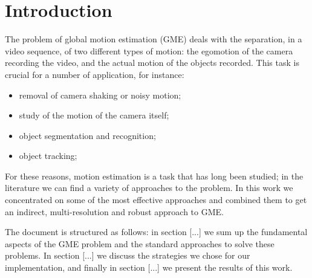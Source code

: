 \section{Introduction}
The problem of global motion estimation (GME) deals with the separation, in a video sequence, of two different types of motion: the egomotion of the camera recording the video, and the actual motion of the objects recorded. This task is crucial for a number of application, for instance:
\begin{itemize}
    \item removal of camera shaking or noisy motion;
    \item study of the motion of the camera itself;
    \item object segmentation and recognition;
    \item object tracking;
\end{itemize}

For these reasons, motion estimation is a task that has long been studied; in the literature we can find a variety of approaches to the problem. In this work we concentrated on some of the most effective approaches and combined them to get an indirect, multi-resolution and robust approach to GME.

The document is structured as follows: in section [...] we sum up the fundamental aspects of the GME problem and the standard approaches to solve these problems. In section [...] we discuss the strategies we chose for our implementation, and finally in section [...] we present the results of this work. 
